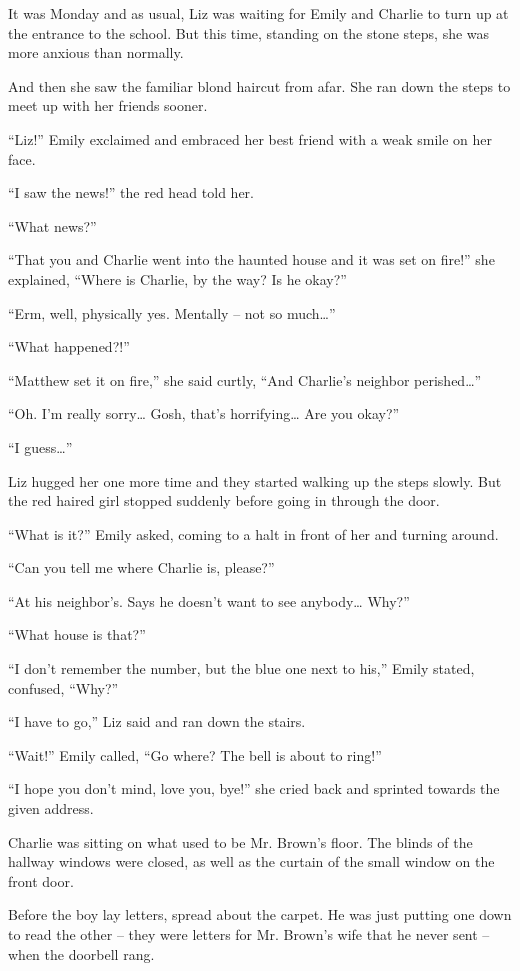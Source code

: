 It was Monday and as usual, Liz was waiting for Emily and Charlie to turn up at the entrance to the school. But this time, standing on the stone steps, she was more anxious than normally.

And then she saw the familiar blond haircut from afar. She ran down the steps to meet up with her friends sooner.

“Liz!” Emily exclaimed and embraced her best friend with a weak smile on her face.

“I saw the news!” the red head told her.

“What news?”

“That you and Charlie went into the haunted house and it was set on fire!” she explained, “Where is Charlie, by the way? Is he okay?”

“Erm, well, physically yes. Mentally – not so much…”

“What happened?!”

“Matthew set it on fire,” she said curtly, “And Charlie’s neighbor perished…”

“Oh. I’m really sorry… Gosh, that’s horrifying… Are you okay?”

“I guess…”

Liz hugged her one more time and they started walking up the steps slowly. But the red haired girl stopped suddenly before going in through the door.

“What is it?” Emily asked, coming to a halt in front of her and turning around.

“Can you tell me where Charlie is, please?”

“At his neighbor’s. Says he doesn’t want to see anybody… Why?”

“What house is that?”

“I don’t remember the number, but the blue one next to his,” Emily stated, confused, “Why?”

“I have to go,” Liz said and ran down the stairs.

“Wait!” Emily called, “Go where? The bell is about to ring!”

“I hope you don’t mind, love you, bye!” she cried back and sprinted towards the given address.

\bigskip

Charlie was sitting on what used to be Mr. Brown’s floor. The blinds of the hallway windows were closed, as well as the curtain of the small window on the front door.

Before the boy lay letters, spread about the carpet. He was just putting one down to read the other – they were letters for Mr. Brown’s wife that he never sent – when the doorbell rang.

